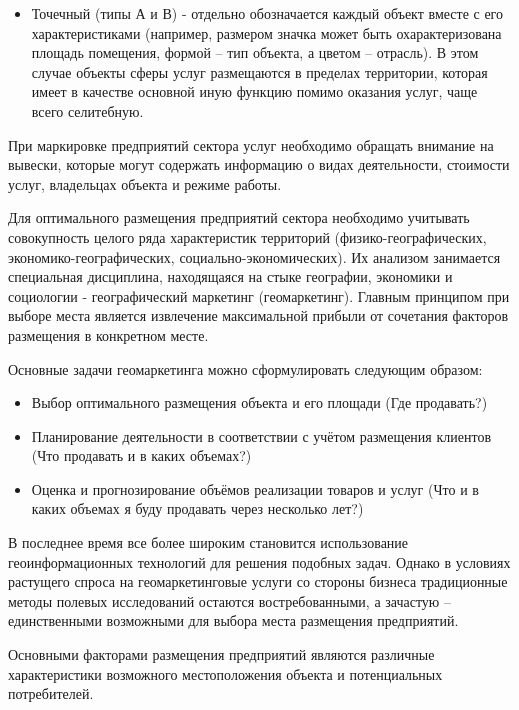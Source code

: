 \documentclass[
  11pt,
  russian,
]{book}
\providecommand{\tightlist}{%
  \setlength{\itemsep}{0pt}\setlength{\parskip}{0pt}}
\begin{document}
\begin{itemize}
\tightlist
\item
  Точечный (типы А и В) - отдельно обозначается каждый объект вместе с его характеристиками (например, размером
  значка может быть охарактеризована площадь помещения, формой -- тип объекта, а цветом -- отрасль). В этом случае объекты сферы услуг размещаются в пределах территории, которая имеет в качестве основной иную функцию помимо оказания услуг, чаще всего селитебную.
\end{itemize}

При маркировке предприятий сектора услуг необходимо обращать внимание на вывески, которые могут содержать информацию о
видах деятельности, стоимости услуг, владельцах объекта и режиме работы.

Для оптимального размещения предприятий сектора необходимо учитывать совокупность целого ряда характеристик территорий
(физико-географических, экономико-географических, социально-экономических). Их анализом занимается специальная дисциплина, находящаяся на стыке географии, экономики и социологии - географический маркетинг (геомаркетинг). Главным принципом при выборе места является извлечение максимальной прибыли от сочетания факторов размещения в конкретном месте.

Основные задачи геомаркетинга можно сформулировать следующим образом:

\begin{itemize}
\tightlist
\item
  Выбор оптимального размещения объекта и его площади (Где продавать?)
\item
  Планирование деятельности в соответствии с учётом размещения клиентов (Что продавать и в каких объемах?)
\item
  Оценка и прогнозирование объёмов реализации товаров и услуг (Что и в каких объемах я буду продавать через несколько лет?)
\end{itemize}

В последнее время все более широким становится использование геоинформационных технологий для решения подобных
задач. Однако в условиях растущего спроса на геомаркетинговые услуги со стороны бизнеса традиционные методы полевых исследований остаются востребованными, а зачастую -- единственными возможными для выбора места размещения предприятий.

Основными факторами размещения предприятий являются различные характеристики возможного местоположения объекта и потенциальных потребителей.
\end{document}
